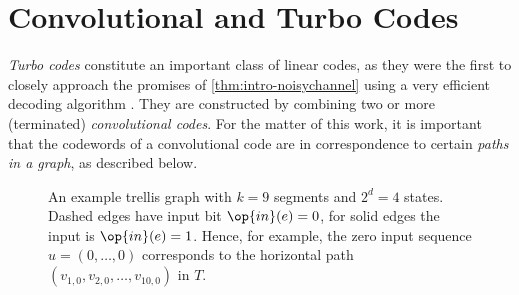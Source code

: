 \section{Convolutional and Turbo Codes} \label{sec:intro-turbo}
\emph{Turbo codes} constitute an important class of linear codes, as they were the first to closely approach the promises of \cref{thm:intro-noisychannel} using a very efficient decoding algorithm \cite{BerrouGlavieux96Turbo}. They are constructed by combining two or more (terminated) \emph{convolutional codes}. For the matter of this work, it is important that the codewords of a convolutional code are in correspondence to certain \emph{paths in a graph}, as described below.

\begin{figure}
\centering
  \caption{An example trellis graph with $k=9$ segments and $2^d = 4$ states. Dashed edges have input bit $\op{in}(e)=0$, for solid edges the input is $\op{in}(e)=1$. Hence, for example, the zero input sequence $u=(0,\dotsc,0)$ corresponds to the horizontal path $(v_{1,0}, v_{2,0},\dotsc, v_{10,0})$ in $T$.}
  \label{fig:intro-trellis}
\end{figure}

